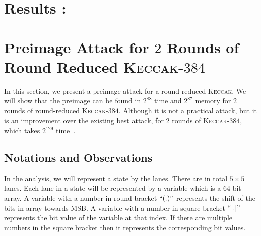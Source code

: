 \documentclass[runningheads]{llncs}
\newcommand{\KECCAK}{\mbox{\textsc{Keccak}}}
\newcommand{\Keccak}{\mbox{\textsc{Keccak}}}
\begin{document}
\section{Results :}

\section{Preimage Attack for $2$ Rounds of Round Reduced \KECCAK-$384$}

In this section, we present a preimage attack for a round reduced \KECCAK{}. We will show that the preimage can be found in $2^{88}$ time and $2^{87}$ memory for $2$ rounds of round-reduced \Keccak-$384$. Although it is not a practical attack, but it is an improvement over the existing best attack, for $2$ rounds of \Keccak-$384$, which takes $2^{129}$ time~\cite{guo2016linear}.


\subsection{Notations and Observations}
In the analysis, we will represent a state by the lanes. There are in total $5\times 5$ lanes. Each lane in a state will be represented by a variable which is a $64$-bit array. 
A variable with a number in round bracket $``( . )"$ represents the shift of the bits in array towards MSB. A variable with a number in square bracket $``[ . ]"$ represents the bit value of the variable at that index. If there are multiple numbers in the square bracket then it represents the corresponding bit values.

\end{document}
